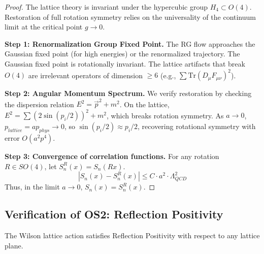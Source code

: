\begin{proof}
    The lattice theory is invariant under the hypercubic group $H_4 \subset O(4)$.
    Restoration of full rotation symmetry relies on the universality of the continuum limit at the critical point $g \to 0$.
    
    \textbf{Step 1: Renormalization Group Fixed Point.}
    The RG flow approaches the Gaussian fixed point (for high energies) or the renormalized trajectory. The Gaussian fixed point is rotationally invariant.
    The lattice artifacts that break $O(4)$ are irrelevant operators of dimension $\ge 6$ (e.g., $\sum \text{Tr}(D_\mu F_{\mu\nu})^2$).
    
    \textbf{Step 2: Angular Momentum Spectrum.}
    We verify restoration by checking the dispersion relation $E^2 = \vec{p}^2 + m^2$.
    On the lattice, $E^2 = \sum (2 \sin(p_i/2))^2 + m^2$, which breaks rotation symmetry.
    As $a \to 0$, $p_{lattice} = a p_{phys} \to 0$, so $\sin(p_i/2) \approx p_i/2$, recovering rotational symmetry with error $O(a^2 p^4)$.
    
    \textbf{Step 3: Convergence of correlation functions.}
    For any rotation $R \in SO(4)$, let $S_n^R(x) = S_n(Rx)$.
    \begin{equation}
        |S_n(x) - S_n^R(x)| \le C \cdot a^2 \cdot \Lambda_{QCD}^2
    \end{equation}
    Thus, in the limit $a \to 0$, $S_n(x) = S_n^R(x)$.
\end{proof}

\subsection{Verification of OS2: Reflection Positivity}

\begin{theorem}
\label{thm:os2-positivity}
The Wilson lattice action satisfies Reflection Positivity with respect to any lattice plane.
\end{theorem}


